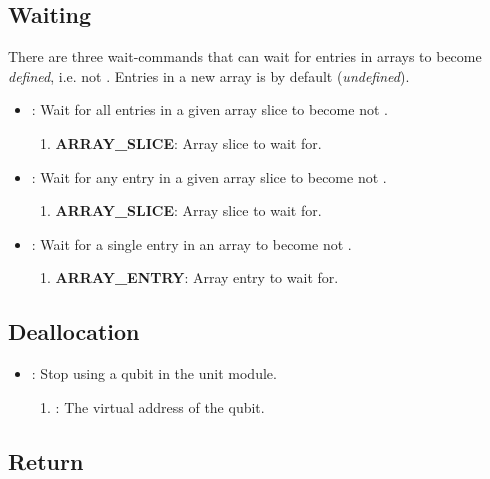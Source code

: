 \subsection{Waiting}
\label{app:waiting}

There are three wait-commands that can wait for entries in arrays to become \emph{defined}, i.e. not .
Entries in a new array is by default  (\emph{undefined}).
\begin{itemize}
  \item {}: Wait for all entries in a given array slice to become not .
        \begin{enumerate}
          \item \textbf{ARRAY\_SLICE}: Array slice to wait for.
        \end{enumerate}
  \item {}: Wait for any entry in a given array slice to become not .
        \begin{enumerate}
          \item \textbf{ARRAY\_SLICE}: Array slice to wait for.
        \end{enumerate}
  \item {}: Wait for a single entry in an array to become not .
        \begin{enumerate}
          \item \textbf{ARRAY\_ENTRY}: Array entry to wait for.
        \end{enumerate}
\end{itemize}

\subsection{Deallocation}
\begin{itemize}
  \item {}: Stop using a qubit in the unit module.
        \begin{enumerate}
          \item \REGISTER: The virtual address of the qubit.
        \end{enumerate}
\end{itemize}


\subsection{Return}

